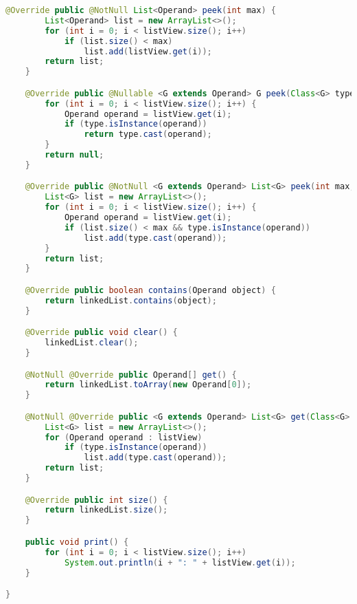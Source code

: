 \begin{lstlisting}[caption=OperandStack (Keienburg),label=list:OperandStack,language=Java]
    @Override public @NotNull List<Operand> peek(int max) {
        List<Operand> list = new ArrayList<>();
        for (int i = 0; i < listView.size(); i++)
            if (list.size() < max)
                list.add(listView.get(i));
        return list;
    }

    @Override public @Nullable <G extends Operand> G peek(Class<G> type) {
        for (int i = 0; i < listView.size(); i++) {
            Operand operand = listView.get(i);
            if (type.isInstance(operand))
                return type.cast(operand);
        }
        return null;
    }

    @Override public @NotNull <G extends Operand> List<G> peek(int max, Class<G> type) {
        List<G> list = new ArrayList<>();
        for (int i = 0; i < listView.size(); i++) {
            Operand operand = listView.get(i);
            if (list.size() < max && type.isInstance(operand))
                list.add(type.cast(operand));
        }
        return list;
    }

    @Override public boolean contains(Operand object) {
        return linkedList.contains(object);
    }

    @Override public void clear() {
        linkedList.clear();
    }

    @NotNull @Override public Operand[] get() {
        return linkedList.toArray(new Operand[0]);
    }

    @NotNull @Override public <G extends Operand> List<G> get(Class<G> type) {
        List<G> list = new ArrayList<>();
        for (Operand operand : listView)
            if (type.isInstance(operand))
                list.add(type.cast(operand));
        return list;
    }

    @Override public int size() {
        return linkedList.size();
    }

    public void print() {
        for (int i = 0; i < listView.size(); i++)
            System.out.println(i + ": " + listView.get(i));
    }

}
\end{lstlisting} 

